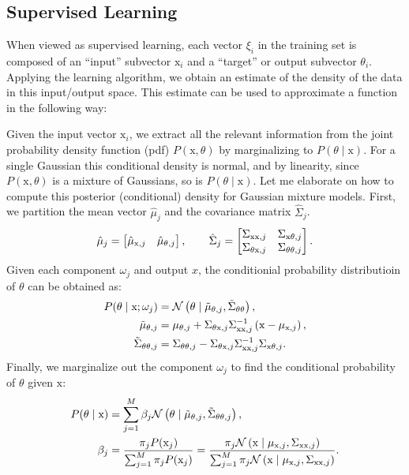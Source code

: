 \subsection{Supervised Learning}
%
When viewed as supervised learning, each vector $\xi_i$ in the training set is
composed of an ``input'' subvector $\mathrm{x}_i$ and a ``target'' or output
subvector $\theta_i$. Applying the learning algorithm, we obtain an estimate of
the density of the data in this input/output space. This estimate can be used to
approximate a function in the following way:

Given the input vector $\mathrm{x}_i$, we extract all the relevant information
from the joint probability density function (pdf) $P(\mathrm{x}, \theta)$ by
marginalizing to $P(\theta \mid \mathrm{x})$. For a single Gaussian this
conditional density is normal, and by linearity, since $P(\mathrm{x}, \theta)$
is a mixture of Gaussians, so is $P(\theta \mid \mathrm{x})$. Let me elaborate
on how to compute this posterior (conditional) density for Gaussian mixture
models. First, we partition the mean vector $\hat{\mu}_j$ and the covariance
matrix $\hat{\Sigma}_j$.
%
\begin{equation}
    \hat{\mu}_j = \begin{bmatrix}\hat{\mu}_{\mathrm{x},j} & \hat{\mu}_{\theta,j}\end{bmatrix}, \qquad
    \hat{\Sigma}_j = \begin{bmatrix}
        \Sigma_{\mathrm{xx}, j} & \Sigma_{\mathrm{x}\theta, j} \\
        \Sigma_{\theta\mathrm{x}, j} & \Sigma_{\theta\theta, j}
    \end{bmatrix}.
    \label{eq:partition}
\end{equation}
%
Given each component $\omega_j$ and output $x$, the conditionial probability 
distributioin of $\theta$ can be obtained as:
%
\begin{align*}
    P(\theta \mid \mathrm{x}; \omega_j) &= \mathcal{N}\left( \theta \mid \tilde{\mu}_{\theta,j}, \tilde{\Sigma}_{\theta\theta} \right), \\
    \tilde{\mu}_{\theta, j} &=  \mu_{\theta, j} + \Sigma_{\theta\mathrm{x}, j}\Sigma_{\mathrm{xx}, j}^{-1} \left( \mathrm{x} - \mu_{\mathrm{x},j} \right), \\
    \tilde{\Sigma}_{\theta\theta, j} &= \Sigma_{\theta\theta, j} - \Sigma_{\theta\mathrm{x}, j}\Sigma_{\mathrm{xx}, j}^{-1}\Sigma_{\mathrm{x}\theta, j}.
\end{align*}
%
Finally, we marginalize out the component $\omega_j$ to find the conditional 
probability of $\theta$ given $\mathrm{x}$:
%
\begin{align}
    \begin{split}
    P(\theta \mid \mathrm{x}) &= \sum_{j=1}^M \beta_j \mathcal{N}\left(\theta \mid \tilde{\mu}_{\theta,j}, \tilde{\Sigma}_{\theta\theta,j} \right), \\
    \beta_j &= \frac{\pi_j P(\mathrm{x}_j)}{\sum_{j=1}^M \pi_j P(\mathrm{x}_j)} = 
    \frac{\pi_j \mathcal{N}\left(\mathrm{x} \mid {\mu}_{\mathrm{x},j}, {\Sigma}_{\mathrm{xx},j} \right)}
    {\sum_{j=1}^M \pi_j \mathcal{N}\left(\mathrm{x} \mid {\mu}_{\mathrm{x},j}, {\Sigma}_{\mathrm{xx},j} \right)}.
    \end{split}
    \label{eq:posterior_distribution}
\end{align}
